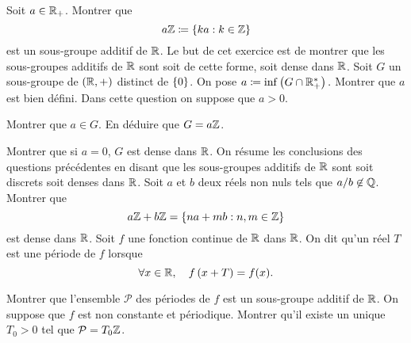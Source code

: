\documentclass{magnolia}
\begin{document}
\begin{questions}
\question Soit $a\in\mathbb{R}_+$. Montrer que
  \[a\mathbb{Z}\coloneqq\left\{ka : k\in\mathbb{Z}\right\}\]
  est un sous-groupe additif de $\mathbb{R}$.
\enonce Le but de cet exercice est de montrer que les sous-groupes additifs de $\mathbb{R}$ sont soit de cette forme, soit dense dans $\mathbb{R}$. Soit $G$ un sous-groupe de $\left(\mathbb{R},+\right)$ distinct de $\left\{0\right\}$. On pose $a\coloneqq\inf\left(G\cap\mathbb{R}_+^*\right).$
\question Montrer que $a$ est bien défini.
\question Dans cette question on suppose que $a>0$.
  \begin{questions}
  \question Montrer que $a\in G$.
  \question En déduire que $G=a\mathbb{Z}$.
  \end{questions}
\question Montrer que si $a=0$, $G$ est dense dans $\mathbb{R}$.
\enonce On résume les conclusions des questions précédentes en disant que les
  sous-groupes additifs de $\mathbb{R}$ sont soit discrets soit denses dans $\mathbb{R}$.
\question 
  Soit $a$ et $b$ deux réels non nuls tels que $a/b\not\in\mathbb{Q}$. Montrer que
  \[a\mathbb{Z}+b\mathbb{Z}=\left\{na+mb : n,m\in\mathbb{Z}\right\}\]
  est dense dans $\mathbb{R}$.
\question 
  Soit $f$ une fonction continue de $\mathbb{R}$ dans $\mathbb{R}$. On dit qu'un réel $T$ est
  une période de $f$ lorsque
  \[\forall x\in\mathbb{R} ,\quad f\left(x+T\right)=f(x).\]
  \begin{questions}
  \question Montrer que l'ensemble $\mathcal{P}$ des périodes de $f$ est un
    sous-groupe additif de $\mathbb{R}$.
  \question On suppose que $f$ est non constante et périodique. Montrer qu'il
    existe un unique $T_0>0$ tel que $\mathcal{P}=T_0\mathbb{Z}$.
  \end{questions}
\end{questions}
\end{document}
